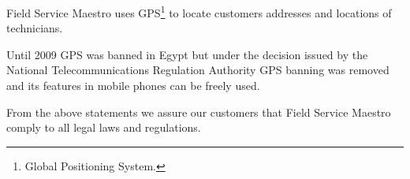 Field Service Maestro uses GPS\footnote{Global Positioning System.} to locate customers addresses and locations of technicians.

Until 2009 GPS was banned in Egypt but under the decision issued by the National Telecommunications Regulation Authority GPS banning was removed and its features in mobile phones can be freely used.\cite{gps_remove_ban}

From the above statements we assure our customers that Field Service Maestro comply to all legal laws and regulations.